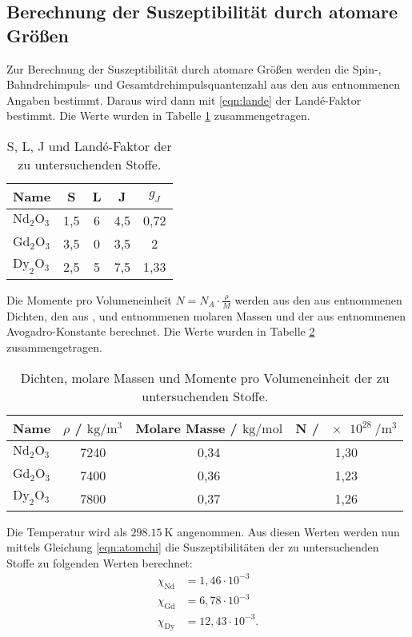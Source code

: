 \subsection{Berechnung der Suszeptibilität durch atomare Größen}
Zur Berechnung der Suszeptibilität durch atomare Größen werden die Spin-, Bahndrehimpuls- und Gesamtdrehimpulsquantenzahl aus den aus \cite{sample} entnommenen Angaben bestimmt.
Daraus wird dann mit \eqref{eqn:lande} der Landé-Faktor bestimmt. Die Werte wurden in Tabelle \ref{tab:lande} zusammengetragen.
\begin{table}
  \centering
  \caption{S, L, J und Landé-Faktor der zu untersuchenden Stoffe.}
  \label{tab:lande}
  \begin{tabular}{l c c c c}
    \toprule
Name & S & L & J & $g_J$ \\
    \midrule
  $\text{Nd}_2 \text{O}_3$ & 1,5 & 6 & 4,5 & 0,72 \\
  $\text{Gd}_2 \text{O}_3$ & 3,5 & 0 & 3,5 & 2 \\
  $\text{Dy}_2 \text{O}_3$ & 2,5 & 5 & 7,5 & 1,33 \\
  \bottomrule
  \end{tabular}
\end{table}
Die Momente pro Volumeneinheit $N=N_A \cdot \frac{\rho}{M}$ werden aus den aus \cite{sample} entnommenen Dichten, den aus \cite{nd}, \cite{dy} und \cite{gd} entnommenen molaren Massen und der
aus \cite{scipy} entnommenen Avogadro-Konstante berechnet. Die Werte wurden in Tabelle \ref{tab:N} zusammengetragen.
\begin{table}
  \centering
  \caption{Dichten, molare Massen und Momente pro Volumeneinheit der zu untersuchenden Stoffe.}
  \label{tab:N}
  \begin{tabular}{l c c c}
    \toprule
Name & $\rho$ / $\si{\kilo\gram\per\meter\cubed}$ & Molare Masse / $\si{\kilo\gram\per\mol}$ & N / $\SI{e28}{\per\meter\cubed}$ \\
    \midrule
  $\text{Nd}_2 \text{O}_3$ & 7240 & 0,34 & 1,30\\
  $\text{Gd}_2 \text{O}_3$ & 7400 & 0,36 & 1,23\\
  $\text{Dy}_2 \text{O}_3$ & 7800 & 0,37 & 1,26 \\
  \bottomrule
  \end{tabular}
\end{table}
Die Temperatur wird als $\SI{298.15}{\kelvin}$ angenommen.
Aus diesen Werten werden nun mittels Gleichung \eqref{eqn:atomchi} die Suszeptibilitäten der zu untersuchenden Stoffe zu folgenden Werten berechnet:
\begin{align*}
  \chi_\text{Nd} &= 1,46\cdot10^{-3} \\
  \chi_\text{Gd} &= 6,78\cdot10^{-3}\\
  \chi_\text{Dy} &= 12,43\cdot10^{-3} .
\end{align*}

